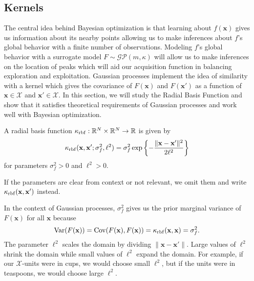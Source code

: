 \subsection{Kernels}\label{ssec:kernel}

The central idea behind Bayesian optimization is that learning about $f(\mathbf{x})$ gives us information about its nearby points allowing us to make inferences about $f$'s global behavior with a finite number of observations.
Modeling $f$'s global behavior with a surrogate model $F \sim \mathcal{GP}(m, \kappa)$ will allow us to make inferences on the location of peaks which will aid our acquisition function in balancing exploration and exploitation.
Gaussian processes implement the idea of similarity with a kernel which gives the covariance of $F(\mathbf{x})$ and $F(\mathbf{x}')$ as a function of $\mathbf{x} \in \mathcal{X}$ and $\mathbf{x}' \in \mathcal{X}$.
In this section, we will study the Radial Basis Function and show that it satisfies theoretical requirements of Gaussian processes and work well with Bayesian optimization.

\begin{definition}\label{def:rbf}
    A radial basis function $\kappa_{\mathrm{rbf}}: \mathbb{R}^{N} \times \mathbb{R}^{N} \to \mathbb{R}$
    is given by
    \begin{equation}\label{eq:rbf}
        \kappa_{\mathrm{rbf}}(\mathbf{x}, \mathbf{x}'; \sigma_f^2, \ell^2)
        = \sigma_f^{2} \exp \left\{ - \frac{ \lVert \mathbf{x} - \mathbf{x}' \rVert^2 }{ 2 \ell^2 }\right\}
    \end{equation}
    for parameters $\sigma_f^2 > 0$ and $\ell^2 > 0$.

    If the parameters are clear from context or not relevant, we omit them and write $\kappa_{\mathrm{rbf}}(\mathbf{x}, \mathbf{x}')$ instead.
\end{definition}
In the context of Gaussian processes, $\sigma_f^2$ gives us the prior marginal variance of $F(\mathbf{x})$ for all $\mathbf{x}$ because
\begin{equation*}
    \operatorname{Var}(F(\mathbf{x})) = \operatorname{Cov}(F(\mathbf{x}), F(\mathbf{x})) = \kappa_{\mathrm{rbf}}(\mathbf{x}, \mathbf{x}) = \sigma_f^2.
\end{equation*}
The parameter $\ell^2$ scales the domain by dividing $\lVert \mathbf{x} - \mathbf{x}' \rVert$.
Large values of $\ell^2$ shrink the domain while small values of $\ell^2$ expand the domain.
For example, if our $\mathcal{X}$-units were in cups, we would choose small $\ell^2$, but if the units were in teaspoons, we would choose large $\ell^2$.

